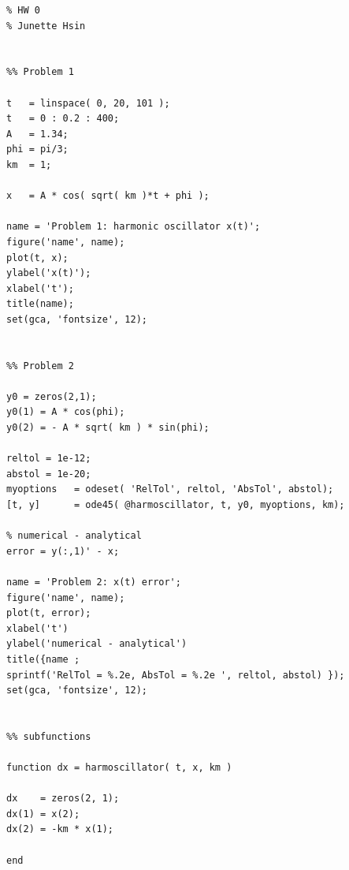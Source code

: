 \documentclass[conf]{new-aiaa}
\begin{document}
\begin{lstlisting}[basicstyle=\footnotesize]
% ASE 389 Orbit Determination
% HW 0
% Junette Hsin 


%% Problem 1 

t   = linspace( 0, 20, 101 ); 
t   = 0 : 0.2 : 400; 
A   = 1.34; 
phi = pi/3; 
km  = 1; 

x   = A * cos( sqrt( km )*t + phi ); 

name = 'Problem 1: harmonic oscillator x(t)'; 
figure('name', name); 
plot(t, x); 
ylabel('x(t)'); 
xlabel('t'); 
title(name); 
set(gca, 'fontsize', 12); 


%% Problem 2 

y0 = zeros(2,1); 
y0(1) = A * cos(phi); 
y0(2) = - A * sqrt( km ) * sin(phi); 

reltol = 1e-12; 
abstol = 1e-20; 
myoptions   = odeset( 'RelTol', reltol, 'AbsTol', abstol); 
[t, y]      = ode45( @harmoscillator, t, y0, myoptions, km); 

% numerical - analytical 
error = y(:,1)' - x; 

name = 'Problem 2: x(t) error'; 
figure('name', name); 
plot(t, error); 
xlabel('t')
ylabel('numerical - analytical')
title({name ;
sprintf('RelTol = %.2e, AbsTol = %.2e ', reltol, abstol) }); 
set(gca, 'fontsize', 12); 


%% subfunctions 

function dx = harmoscillator( t, x, km )

dx    = zeros(2, 1); 
dx(1) = x(2); 
dx(2) = -km * x(1); 

end 
\end{lstlisting}


\newpage

\end{document}
